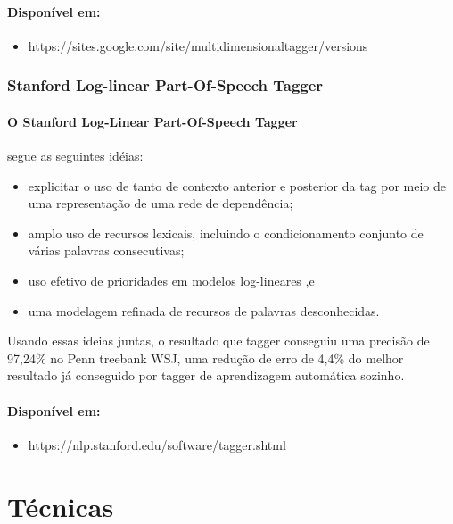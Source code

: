 \documentclass[a4paper, 10pt]{article}
\begin{document}
                \paragraph{Disponível em:}
                \begin{itemize}
                    \item https://sites.google.com/site/multidimensionaltagger/versions
                \end{itemize}
            \subsubsection{Stanford Log-linear Part-Of-Speech Tagger}
            	\paragraph{O Stanford Log-Linear Part-Of-Speech Tagger} segue as seguintes idéias:
                \begin{itemize}
                	\item explicitar o uso de tanto de contexto anterior e posterior da tag por meio de uma representação de uma rede de dependência;
                    \item amplo uso de recursos lexicais, incluindo o condicionamento conjunto de várias palavras consecutivas;
                    \item uso efetivo de prioridades em modelos log-lineares ,e
                    \item uma modelagem refinada de recursos de palavras desconhecidas.
                \end{itemize}
            	Usando essas ideias juntas, o resultado que tagger conseguiu uma precisão de 97,24\% no Penn treebank WSJ, uma redução de erro de 4,4\% do melhor resultado já conseguido por tagger de aprendizagem automática sozinho.
            	
        	    \paragraph{Disponível em:}
                \begin{itemize}
                    \item https://nlp.stanford.edu/software/tagger.shtml
                \end{itemize}
	\section{Técnicas}
\end{document}
